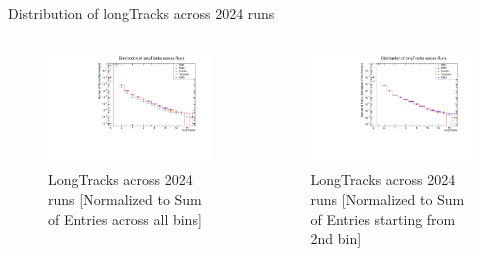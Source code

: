 \begin{frame}{Distribution of longTracks across 2024 runs}
	\begin{columns}
		\begin{column}{0.55 \linewidth}
			\begin{figure}
				\includegraphics[width=\linewidth]{./RunwisePlots/longTracks_runwise.pdf}
				\caption{LongTracks across 2024 runs [Normalized to Sum of Entries across all bins]}
			\end{figure}
		\end{column}
		\begin{column}{0.55 \linewidth}
			\begin{figure}
				\includegraphics[width=\linewidth]{RunwisePlots/longTracks_normalisedfrom2_runwise.pdf}
				\caption{LongTracks across 2024 runs [Normalized to Sum of Entries starting from 2nd bin]}

\end{figure}
\end{column}
\end{columns}
\end{frame}

